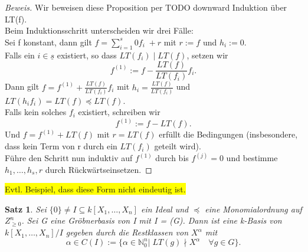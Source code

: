 \documentclass{article}
\newtheorem{satz}{Satz}
\newcommand*{\R}{k[X_{1},\ldots,X_{n}]}
\begin{document}
	\begin{proof}[Beweis]
	Wir beweisen diese Proposition per TODO downward Induktion über LT(f). \\
	Beim Induktionsschritt unterscheiden wir drei Fälle:\\
	Sei f konstant, dann gilt \(f = \sum_{i=1}^{s} 0f_{i}\; + r\) mit \(r := f\) und \(h_{i} := 0\). \\
	Falls ein \(i \in \underline{s}\) existiert, so dass \(LT(f_{i})\;| \; LT(f)\), setzen wir
	\begin{displaymath} f^{(1)} := f - \frac{LT(f)}{LT(f_{i})}f_{i}.\end{displaymath} Dann gilt
	\( f = f^{(1)} + \frac{LT(f)}{LT(f_{i})}f_{i} \) mit \(h_{i} = \frac{LT(f)}{LT(f_{i})}\) und 
	\(LT(h_{i}f_{i}) = LT(f) \preceq LT(f).\) \\
	Falls kein solches \(f_{i}\) existiert, schreiben wir \begin{displaymath} f^{(1)} := f -
	LT(f). \end{displaymath} Und \(f = f^{(1)} + LT(f)\) mit \(r = LT(f)\) erfüllt die Bedingungen 
	(insbesondere, dass kein Term von r durch ein \(LT(f_{i})\) geteilt wird). \\
	Führe den Schritt nun induktiv auf \(f^{(1)}\) durch bis \(f^{(j)} = 0\) und bestimme
	\(h_{1}, \ldots, h_{s}, r\) durch Rückwärtseinsetzen.
	\end{proof}

	
	\colorbox{yellow}{Evtl. Beispiel, dass diese Form nicht eindeutig ist.}


	\begin{satz} \label{1.2.8}
	Sei \(\{0\} \neq I \subseteq \R\) ein Ideal und \(\preceq\) eine Monomialordnung auf
	\(Z^{n}_{\geq 0}\). Sei G eine Gröbnerbasis von I mit I = (G). Dann ist eine k-Basis von 
	\(\R/I\) gegeben durch die Restklassen von \(X^{\alpha}\) mit
	\begin{displaymath}
	\alpha \in C(I) := \{\alpha \in \mathbb{N}^{n}_{0} |\; LT(g) \nmid X^{\alpha}\quad \forall g 
	\in G\}.
	\end{displaymath}
	\end{satz}
\end{document}
